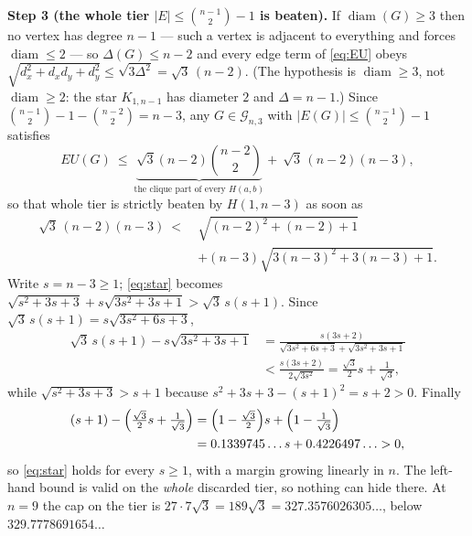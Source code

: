 \documentclass[11pt]{amsart}
\theoremstyle{remark}
\DeclareMathOperator{\diam}{diam}
\newcommand{\EU}{\mathit{EU}}
\newcommand{\Gnd}{\mathcal G}
\begin{document}
\medskip
\noindent\textbf{Step 3 (the whole tier $|E|\le\binom{n-1}2-1$ is beaten).}
If $\diam(G)\ge3$ then no vertex has degree $n-1$ --- such a vertex is adjacent
to everything and forces $\diam\le2$ --- so $\Delta(G)\le n-2$ and every edge
term of \eqref{eq:EU} obeys
$\sqrt{d_x^2+d_xd_y+d_y^2}\le\sqrt{3\Delta^2}=\sqrt3\,(n-2)$.
(The hypothesis is $\diam\ge3$, not $\diam\ge2$: the star $K_{1,n-1}$ has
diameter $2$ and $\Delta=n-1$.)
Since $\binom{n-1}2-1-\binom{n-2}2=n-3$, any $G\in\Gnd_{n,3}$ with
$|E(G)|\le\binom{n-1}2-1$ satisfies
\[
 \EU(G)\ \le\ \underbrace{\sqrt3(n-2)\binom{n-2}2}_{\text{the clique part of every }H(a,b)}
            +\ \sqrt3\,(n-2)(n-3),
\]
so that whole tier is strictly beaten by $H(1,n-3)$ as soon as
\begin{equation}\label{eq:star}
\begin{split}
 \sqrt3\,(n-2)(n-3)\ <\ &\sqrt{(n-2)^2+(n-2)+1}\\
 &+(n-3)\sqrt{3(n-3)^2+3(n-3)+1}.
\end{split}
\end{equation}
Write $s=n-3\ge1$; \eqref{eq:star} becomes
$\sqrt{s^2+3s+3}+s\sqrt{3s^2+3s+1}>\sqrt3\,s(s+1)$. Since
$\sqrt3\,s(s+1)=s\sqrt{3s^2+6s+3}$,
\begin{align*}
 \sqrt3\,s(s+1)-s\sqrt{3s^2+3s+1}
 &=\frac{s(3s+2)}{\sqrt{3s^2+6s+3}+\sqrt{3s^2+3s+1}}\\
 &<\frac{s(3s+2)}{2\sqrt{3s^2}}
 =\frac{\sqrt3}{2}s+\frac1{\sqrt3},
\end{align*}
while $\sqrt{s^2+3s+3}>s+1$ because $s^2+3s+3-(s+1)^2=s+2>0$. Finally
\begin{align*}
 (s+1)-\Bigl(\tfrac{\sqrt3}2s+\tfrac1{\sqrt3}\Bigr)
 &=\Bigl(1-\tfrac{\sqrt3}2\Bigr)s+\Bigl(1-\tfrac1{\sqrt3}\Bigr)\\
 &=0.1339745\ldots s+0.4226497\ldots>0 ,
\end{align*}
so \eqref{eq:star} holds for every $s\ge1$, with a margin growing linearly in
$n$. The left-hand bound is valid on the \emph{whole} discarded tier, so
nothing can hide there. At $n=9$ the cap on the tier is
$27\cdot7\sqrt3=189\sqrt3=327.3576026305\ldots$, below
$329.7778691654\ldots$
\end{document}
